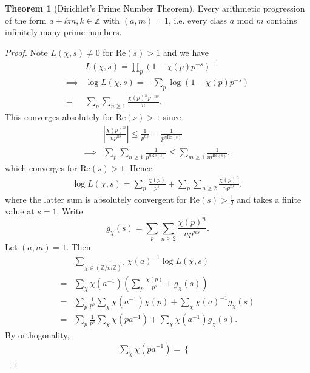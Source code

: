 \documentclass{article}
\theoremstyle{definition}
\newtheorem{theorem}{Theorem}[section]
\begin{document}
\begin{theorem}[Dirichlet's Prime Number Theorem]\label{theorem2.37}
    Every arithmetic progression of the form $a \pm km, k \in \mathbb{Z}$ with $(a,m)=1$, i.e. every class $a$ mod $m$ contains infinitely many prime numbers.
\end{theorem}
\begin{proof}
    Note $L(\chi,s) \neq 0$ for $\text{Re}(s)>1$ and we have
    \begin{align*}
        &L(\chi,s) = \prod_{p}^{} (1-\chi(p)p^{-s})^{-1} \\
        \implies & \log L(\chi,s) = - \sum_{p}^{} \log(1-\chi(p)p^{-s})\\
        =& \sum_{p}^{} \sum_{n\ge 1}^{} \frac{\chi(p)^n p^{-ns}}{n}.
    \end{align*}
    This converges absolutely for $\text{Re}(s)>1$ since 
    \begin{align*}
        &\left|\frac{\chi(p)^n}{np^{ns}}\right|\le \frac{1}{p^{ns}} = \frac{1}{p^{n \text{Re}(s)}} \\
        \implies & \sum_{p}^{} \sum_{n\ge 1} \frac{1}{p^{n \text{Re}(s)}} \le \sum_{m\ge 1}^{} \frac{1}{m^{\text{Re}(s)}}, 
    \end{align*}
    which converges for $\text{Re}(s)>1$. Hence 
    \begin{align*}
        \log L(\chi,s) = \sum_{p}^{} \frac{\chi(p)}{p^{s}} + \sum_{p}^{} \sum_{n\ge 2}^{} \frac{\chi(p)^{n}}{np^{ns}},
    \end{align*}
    where the latter sum is absolutely convergent for $\text{Re}(s)>\frac{1}{2}$ and takes a finite value at $s=1$. Write $$g_{\chi}(s) = \sum_{p}^{} \sum_{n\ge 2}^{} \frac{\chi(p)^n}{np^{ns}}.$$ 
    Let $(a,m)=1$. Then 
    \begin{align*}
        &\sum_{\chi \in \widehat{(\mathbb{Z}/m\mathbb{Z})^\times}}^{} \chi(a)^{-1} \log L(\chi,s) \\
        =& \sum_{\chi}^{} \chi(a^{-1}) \left(\sum_{p}^{} \frac{\chi(p)}{p^s} + g_\chi(s)\right) \\
        =& \sum_{p}^{} \frac{1}{p^s} \sum_{\chi}^{} \chi(a^{-1})\chi(p) + \sum_{\chi}^{} \chi(a)^{-1} g_\chi(s) \\
        =& \sum_{p}^{} \frac{1}{p^s} \sum_{\chi}^{} \chi(p a^{-1}) + \sum_{\chi}^{} \chi(a^{-1})g_{\chi}(s).
    \end{align*}
    By orthogonality,
    \begin{align*}
        \sum_{\chi}^{} \chi(p a^{-1}) = \begin{cases}

\end{cases}
\end{align*}
\end{proof}
\end{document}
